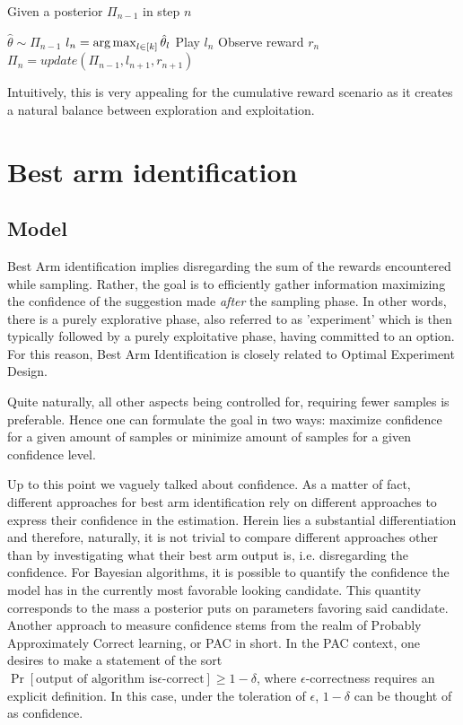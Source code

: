 \begin{algorithm}[H]
    \caption{Given a posterior $\Pi_{n-1}$ in step $n$}
    \label{alg:thompson_sampling}
  \begin{algorithmic}
    \State $\hat{\theta} \sim \Pi_{n-1}$
    \State $l_n = \operatorname*{arg\,max}_{l \in [k]}\hat{\theta}_l$
    \State Play $l_n$
    \State Observe reward $r_n$
    \State $\Pi_n = update(\Pi_{n-1}, l_{n+1}, r_{n+1})$
  \end{algorithmic}
\end{algorithm}

Intuitively, this is very appealing for the cumulative reward scenario as it
creates a natural balance between exploration and exploitation.

\section{Best arm identification}
\subsection{Model}\label{ss:top-1_model}

Best Arm identification implies disregarding the sum of the rewards encountered
while sampling. Rather, the goal is to efficiently gather information maximizing
the confidence of the suggestion made \emph{after} the sampling phase. In other
words, there is a purely explorative phase, also referred to as 'experiment'
which is then typically followed by a purely exploitative phase, having
committed to an option. For this reason, Best Arm Identification is closely
related to Optimal Experiment Design.

Quite naturally, all other aspects being controlled for, requiring fewer samples
is preferable. Hence one can formulate the goal in two ways: maximize confidence
for a given amount of samples or minimize amount of samples for a given
confidence level.

Up to this point we vaguely talked about confidence. As a matter of fact,
different approaches for best arm identification rely on different approaches to
express their confidence in the estimation. Herein lies a substantial
differentiation and therefore, naturally, it is not trivial to compare different
approaches other than by investigating what their best arm output is, i.e.
disregarding the confidence. For Bayesian algorithms, it is possible to quantify
the confidence the model has in the currently most favorable looking candidate.
This quantity corresponds to the mass a posterior puts on parameters favoring
said candidate. Another approach to measure confidence stems from the realm of
Probably Approximately Correct learning, or PAC in short. In the PAC context,
one desires to make a statement of the sort $\Pr[\text{output of algorithm is
$\epsilon$-correct}] \geq 1 - \delta$, where $\epsilon$-correctness requires an
explicit definition. In this case, under the toleration of $\epsilon$, $1 -
\delta$ can be thought of as confidence.

